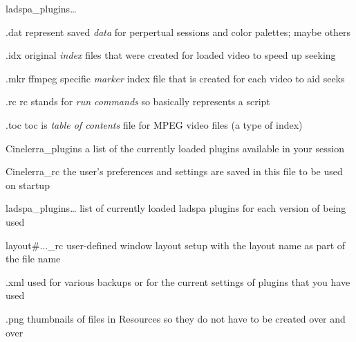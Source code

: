 \begin{labeling}{ladspa\_plugins{\dots}}
	\item [.dat] represent saved \textit{data} for perpertual sessions and color palettes; maybe others
	\item [.idx] original \textit{index} files that were created for loaded video to speed up seeking
	\item [.mkr] ffmpeg specific \textit{marker} index file that is created for each video to aid seeks
	\item [.rc] rc stands for \textit{run commands} so basically represents a script
	\item [.toc] toc is \textit{table of contents} file for MPEG video files (a type of index)
	\item [Cinelerra\_plugins] a list of the currently loaded plugins available in your \CGG{} session
	\item [Cinelerra{}\_rc] the user's preferences and settings are saved in this file to be used on startup
	\item [ladspa\_plugins{\dots}] list of currently loaded ladspa plugins for each version of \CGG{} being used
	\item [layout\#...\_rc] user-defined window layout setup with the layout name as part of the file name
	\item [.xml] used for various backups or for the current settings of plugins that you have used
	\item [.png] thumbnails of files in Resources so they do not have to be created over and over
\end{labeling}

